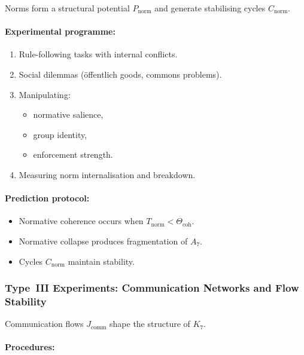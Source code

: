 Norms form a structural potential $P_{\mathrm{norm}}$ and
generate stabilising cycles $C_{\mathrm{norm}}$.

\paragraph{Experimental programme:}

\begin{enumerate}
    \item Rule-following tasks with internal conflicts.
    \item Social dilemmas (öffentlich goods, commons problems).
    \item Manipulating:
          \begin{itemize}
              \item normative salience,
              \item group identity,
              \item enforcement strength.
          \end{itemize}
    \item Measuring norm internalisation and breakdown.
\end{enumerate}

\paragraph{Prediction protocol:}

\begin{itemize}
    \item Normative coherence occurs when
          $T_{\mathrm{norm}} < \Theta_{\mathrm{coh}}$.
    \item Normative collapse produces fragmentation of $A_7$.
    \item Cycles $C_{\mathrm{norm}}$ maintain stability.
\end{itemize}



\subsubsection{Type~III Experiments: Communication Networks and Flow Stability}

Communication flows $J_{\mathrm{comm}}$ shape the structure of $K_7$.

\paragraph{Procedures:}

